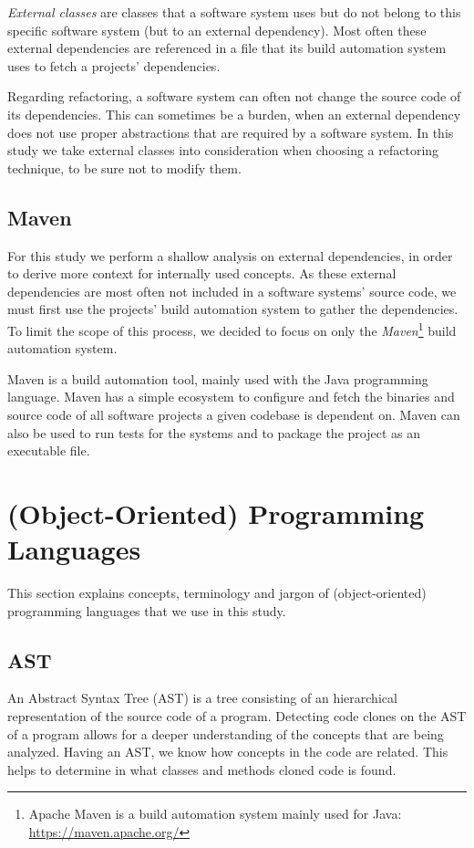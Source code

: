 \textit{External classes} are classes that a software system uses but do not belong to this specific software system (but to an external dependency). Most often these external dependencies are referenced in a file that its build automation system uses to fetch a projects' dependencies.

Regarding refactoring, a software system can often not change the source code of its dependencies. This can sometimes be a burden, when an external dependency does not use proper abstractions that are required by a software system. In this study we take external classes into consideration when choosing a refactoring technique, to be sure not to modify them.

\subsection{Maven}
For this study we perform a shallow analysis on external dependencies, in order to derive more context for internally used concepts. As these external dependencies are most often not included in a software systems' source code, we must first use the projects' build automation system to gather the dependencies. To limit the scope of this process, we decided to focus on only the \textit{Maven}\footnote{Apache Maven is a build automation system mainly used for Java: \url{https://maven.apache.org/}} build automation system.

Maven is a build automation tool, mainly used with the Java programming language. Maven has a simple ecosystem to configure and fetch the binaries and source code of all software projects a given codebase is dependent on. Maven can also be used to run tests for the systems and to package the project as an executable file.

\section{(Object-Oriented) Programming Languages}
This section explains concepts, terminology and jargon of (object-oriented) programming languages that we use in this study.

\subsection{AST} \label{sec:astbackground}
An Abstract Syntax Tree (AST) is a tree consisting of an hierarchical representation of the source code of a program. Detecting code clones on the AST of a program allows for a deeper understanding of the concepts that are being analyzed. Having an AST, we know how concepts in the code are related. This helps to determine in what classes and methods cloned code is found.

